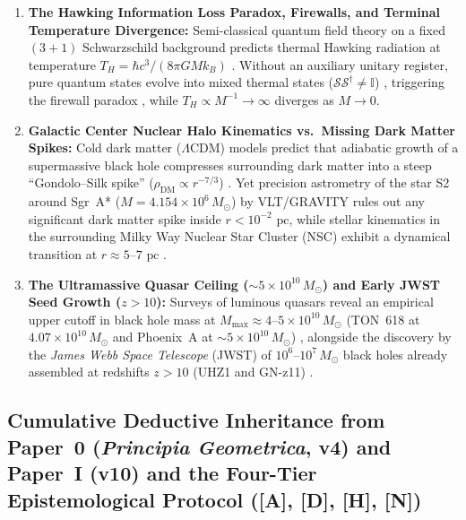 \documentclass[11pt,a4paper]{article}
\newcommand{\catA}{\textbf{\textcolor{purple!80!black}{[A]}}}
\newcommand{\catD}{\textbf{\textcolor{blue!75!black}{[D]}}}
\newcommand{\catH}{\textbf{\textcolor{orange!85!black}{[H]}}}
\newcommand{\catN}{\textbf{\textcolor{teal!75!black}{[N]}}}
\theoremstyle{plain}
\theoremstyle{definition}
\theoremstyle{remark}
\numberwithin{equation}{section}
\begin{document}
\begin{enumerate}
    \item \textbf{The Hawking Information Loss Paradox, Firewalls, and Terminal Temperature Divergence:} Semi-classical quantum field theory on a fixed $(3+1)$ Schwarzschild background predicts thermal Hawking radiation at temperature $T_H = \hbar c^3 / (8\pi G M k_B)$ \cite{hawking1975,unruh1976}. Without an auxiliary unitary register, pure quantum states evolve into mixed thermal states ($\mathcal{S}\mathcal{S}^\dagger \neq \mathbb{I}$) \cite{hawking1976,page1993}, triggering the firewall paradox \cite{almheiri2013,almheiri2020}, while $T_H \propto M^{-1} \to \infty$ diverges as $M \to 0$.

    \item \textbf{Galactic Center Nuclear Halo Kinematics vs.\ Missing Dark Matter Spikes:} Cold dark matter ($\Lambda\text{CDM}$) models predict that adiabatic growth of a supermassive black hole compresses surrounding dark matter into a steep ``Gondolo--Silk spike'' ($\rho_{\text{DM}} \propto r^{-7/3}$) \cite{gondolo1999}. Yet precision astrometry of the star S2 around Sgr~A* ($M = 4.154 \times 10^6\,M_\odot$) by VLT/GRAVITY \cite{gravity2020} rules out any significant dark matter spike inside $r < 10^{-2}\text{ pc}$, while stellar kinematics in the surrounding Milky Way Nuclear Star Cluster (NSC) exhibit a dynamical transition at $r \approx 5\text{--}7\text{ pc}$ \cite{schodel2014,feldmeier2017}.

    \item \textbf{The Ultramassive Quasar Ceiling ($\sim 5 \times 10^{10}\,M_\odot$) and Early JWST Seed Growth ($z > 10$):} Surveys of luminous quasars reveal an empirical upper cutoff in black hole mass at $M_{\max} \approx 4\text{--}5 \times 10^{10}\,M_\odot$ (TON~618 at $4.07 \times 10^{10}\,M_\odot$ and Phoenix~A at $\sim 5 \times 10^{10}\,M_\odot$) \cite{shemmer2004,mcdonald2012,natarajan2009,king2016}, alongside the discovery by the \textit{James Webb Space Telescope} (JWST) of $10^6\text{--}10^7\,M_\odot$ black holes already assembled at redshifts $z > 10$ (UHZ1 and GN-z11) \cite{bogdan2024,maiolino2024}.
\end{enumerate}

\subsection{\texorpdfstring{Cumulative Deductive Inheritance from Paper~0 (\textit{Principia Geometrica}, v4) and Paper~I (v10) and the Four-Tier Epistemological Protocol (\catA, \catD, \catH, \catN)}{Cumulative Deductive Inheritance from Paper 0 (v4) and Paper I (v10) and the Four-Tier Epistemological Protocol ([A], [D], [H], [N])}}
\end{document}
